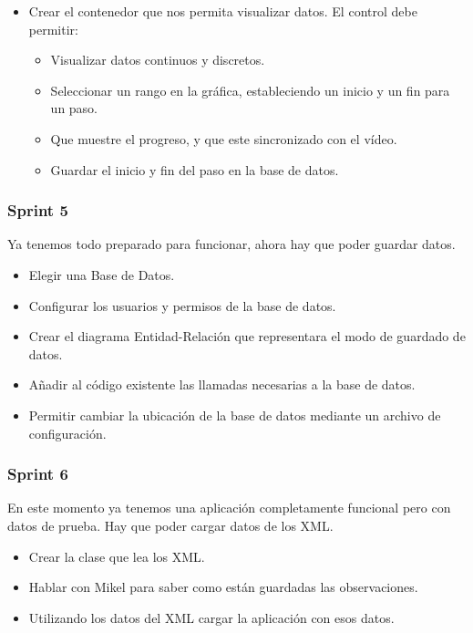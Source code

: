 \begin{itemize}
    \item Crear el contenedor que nos permita visualizar datos. El control debe permitir:
    \begin{itemize}
        \item Visualizar datos continuos y discretos.
        \item Seleccionar un rango en la gr\'{a}fica, estableciendo un inicio y un fin para un paso.
        \item Que muestre el progreso, y que este sincronizado con el v\'{i}deo.
        \item Guardar el inicio y fin del paso en la base de datos.
        
    \end{itemize}
\end{itemize}

\subsubsection{Sprint 5}
Ya tenemos todo preparado para funcionar, ahora hay que poder guardar datos.

\begin{itemize}
    \item Elegir una Base de Datos.
    \item Configurar los usuarios y permisos de la base de datos.
    \item Crear el diagrama Entidad-Relaci\'{o}n que representara el modo de guardado de datos.
    \item A\~{n}adir al c\'{o}digo existente las llamadas necesarias a la base de datos.
    \item Permitir cambiar la ubicaci\'{o}n de la base de datos mediante un archivo de configuraci\'{o}n.
\end{itemize}

\subsubsection{Sprint 6}
En este momento ya tenemos una aplicaci\'{o}n completamente funcional pero con datos de prueba. Hay que poder cargar datos de los XML.

\begin{itemize}
    \item Crear la clase que lea los XML.
    \item Hablar con Mikel para saber como est\'{a}n guardadas las observaciones.
    \item Utilizando los datos del XML cargar la aplicaci\'{o}n con esos datos.
\end{itemize}

